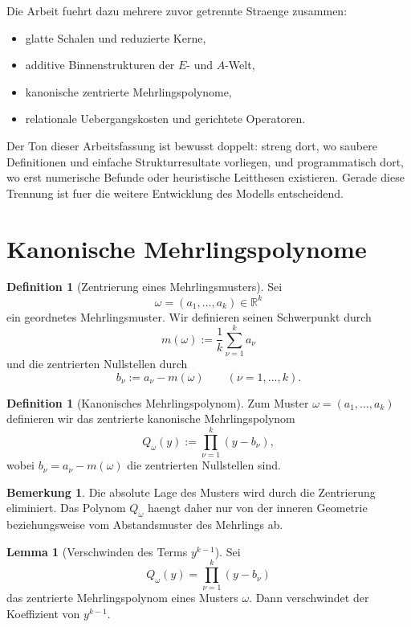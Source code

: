 \documentclass[11pt,a4paper]{article}
\theoremstyle{definition}
\newtheorem{lemma}[satz]{Lemma}
\newtheorem{definition}[satz]{Definition}
\newtheorem{bemerkung}[satz]{Bemerkung}
\begin{document}
Die Arbeit fuehrt dazu mehrere zuvor getrennte Straenge zusammen:
\begin{itemize}[leftmargin=2em]
\item glatte Schalen und reduzierte Kerne,
\item additive Binnenstrukturen der \(E\)- und \(A\)-Welt,
\item kanonische zentrierte Mehrlingspolynome,
\item relationale Uebergangskosten und gerichtete Operatoren.
\end{itemize}

Der Ton dieser Arbeitsfassung ist bewusst doppelt: streng dort, wo saubere Definitionen und einfache Strukturresultate vorliegen, und programmatisch dort, wo erst numerische Befunde oder heuristische Leitthesen existieren. Gerade diese Trennung ist fuer die weitere Entwicklung des Modells entscheidend.

\section{Kanonische Mehrlingspolynome}

\begin{definition}[Zentrierung eines Mehrlingsmusters]
Sei
\[
\omega=(a_1,\dots,a_k)\in\mathbb R^k
\]
ein geordnetes Mehrlingsmuster. Wir definieren seinen Schwerpunkt durch
\[
m(\omega):=\frac{1}{k}\sum_{\nu=1}^k a_\nu
\]
und die zentrierten Nullstellen durch
\[
b_\nu:=a_\nu-m(\omega)\qquad (\nu=1,\dots,k).
\]
\end{definition}

\begin{definition}[Kanonisches Mehrlingspolynom]
Zum Muster \(\omega=(a_1,\dots,a_k)\) definieren wir das zentrierte kanonische Mehrlingspolynom
\[
Q_\omega(y):=\prod_{\nu=1}^k (y-b_\nu),
\]
wobei \(b_\nu=a_\nu-m(\omega)\) die zentrierten Nullstellen sind.
\end{definition}

\begin{bemerkung}
Die absolute Lage des Musters wird durch die Zentrierung eliminiert. Das Polynom \(Q_\omega\) haengt daher nur von der inneren Geometrie beziehungsweise vom Abstandsmuster des Mehrlings ab.
\end{bemerkung}

\begin{lemma}[Verschwinden des Terms \(y^{k-1}\)]
Sei
\[
Q_\omega(y)=\prod_{\nu=1}^k (y-b_\nu)
\]
das zentrierte Mehrlingspolynom eines Musters \(\omega\). Dann verschwindet der Koeffizient von \(y^{k-1}\).
\end{lemma}
\end{document}

